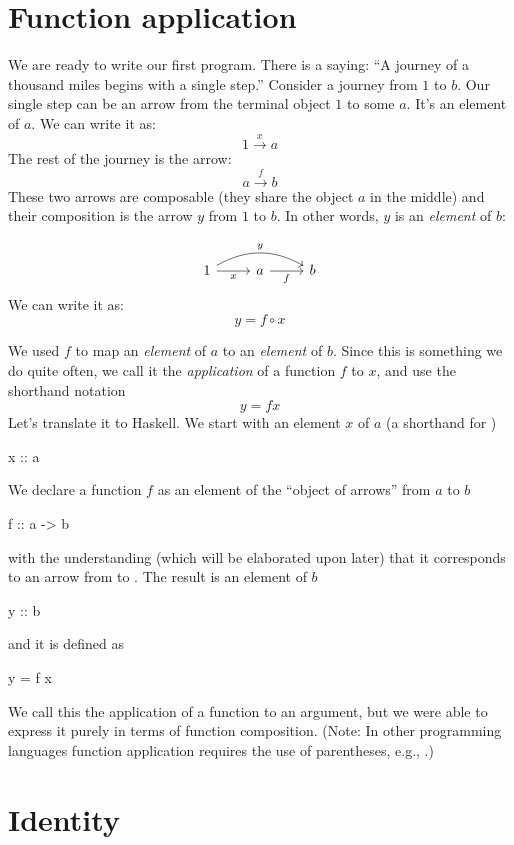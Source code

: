 \documentclass[DaoFP]{subfiles}
\begin{document}
\section{Function application}

We are ready to write our first program. There is a saying: ``A journey of a thousand miles begins with a single step.'' Consider a journey from $1$ to $b$. Our single step can be an arrow from the terminal object $1$ to some $a$. It's an element of $a$. We can write it as:
\[1 \xrightarrow x a \]
The rest of the journey is the arrow:
\[a \xrightarrow f b\]
These two arrows are composable (they share the object $a$ in the middle) and their composition is the arrow $y$ from $1$ to $b$. In other words, $y$ is an \emph{element} of $b$:

\[
 \begin{tikzcd}
 1
 \arrow[rr, bend left, "y"]
 \arrow[r, "x"']
 & a
 \arrow[r, "f"']
& b
 \end{tikzcd}
\]
We can write it as:
\[y = f \circ x \]

We used $f$ to map an \emph{element} of $a$ to an \emph{element} of $b$. Since this is something we do quite often, we call it the \emph{application} of a function $f$ to $x$, and use the shorthand notation
\[y = f x \]
Let's translate it to Haskell. We start with an element $x$ of $a$ (a shorthand for )
\begin{haskell}
x :: a
\end{haskell}
We declare a function $f$ as an element of the ``object of arrows'' from $a$ to $b$
\begin{haskell}
f :: a -> b
\end{haskell}
with the understanding (which will be elaborated upon later) that it corresponds to an arrow from  to . The result is an element of $b$
\begin{haskell}
y :: b
\end{haskell}
and it is defined as
\begin{haskell}
y = f x
\end{haskell}
We call this the application of a function to an argument, but we were able to express it purely in terms of function composition. (Note: In other programming languages function application requires the use of parentheses, e.g., .)

\section{Identity}
\end{document}
